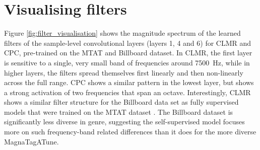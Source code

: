 \section{Visualising filters}
Figure \ref{fig:filter_visualisation} shows the magnitude spectrum of the learned filters of the sample-level convolutional layers (layers 1, 4 and 6) for CLMR and CPC, pre-trained on the MTAT and Billboard dataset.
In CLMR, the first layer is sensitive to a single, very small band of frequencies around 7500~Hz, while in higher layers, the filters spread themselves first linearly and then non-linearly across the full range.
CPC shows a similar pattern in the lowest layer, but shows a strong activation of two frequencies that span an octave.
Interestingly, CLMR shows a similar filter structure for the Billboard data set as fully supervised models that were trained on the MTAT dataset \cite{dieleman2014end,lee2018samplecnn}.
The Billboard dataset is significantly less diverse in genre, suggesting the self-supervised model focuses more on such frequency-band related differences than it does for the more diverse Magna\-Tag\-A\-Tune.

